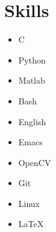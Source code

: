 \documentclass[10pt]{article}
\begin{document}
  
  




\newcommand{\SkillEntry}[2]{ \item #2 #1 }
\vspace{-0.5em}
\section{Skills}
\vspace{-1em}
\begin{multicols}{4}
\raggedcolumns
\begin{itemize}
\renewcommand{\labelitemi}{}
\renewcommand{\skill}{\textnormal}
\setlength{\itemsep}{1pt}
\setlength{\parskip}{0pt}
\setlength{\parsep}{0pt}

\SkillEntry{C}{\threeskill}
\SkillEntry{Python}{\twoskill}
\SkillEntry{Matlab}{\threeskill}
\SkillEntry{Bash}{\twoskill}
\SkillEntry{English}{\twoskill}
\SkillEntry{Emacs}{\twoskill}
\SkillEntry{OpenCV}{\threeskill}
\SkillEntry{Git}{\twoskill}
\SkillEntry{Linux}{\twoskill}
\SkillEntry{\LaTeX}{\twoskill}
\end{itemize}
\end{multicols}\vspace{-1em}
\end{document}
